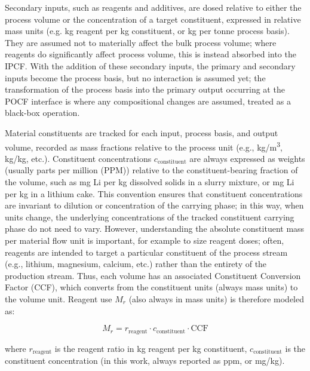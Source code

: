 \documentclass{article}
\renewcommand\_{\textunderscore\allowbreak}
\begin{document}
Secondary inputs, such as reagents and additives, are dosed relative to either the process volume or the concentration of a target constituent, expressed in relative mass units (e.g. kg reagent per kg constituent, or kg per tonne process basis). They are assumed not to materially affect the bulk process volume; where reagents do significantly affect process volume, this is instead absorbed into the IPCF. With the addition of these secondary inputs, the primary and secondary inputs become the process basis, but no interaction is assumed yet; the transformation of the process basis into the primary output occurring at the POCF interface is where any compositional changes are assumed, treated as a black-box operation. 

Material constituents are tracked for each input, process basis, and output volume, recorded as mass fractions relative to the process unit (e.g., \si{kg/m^3}, kg/kg, etc.). Constituent concentrations $c_\text{constituent}$ are always expressed as weights (usually parts per million (PPM)) relative to the constituent-bearing fraction of the volume, such as mg Li per kg dissolved solids in a slurry mixture, or mg Li per kg  in a lithium cake. This convention ensures that constituent concentrations are invariant to dilution or concentration of the carrying phase; in this way, when units change, the underlying concentrations of the tracked constituent carrying phase do not need to vary. However, understanding the absolute constituent mass per material flow unit is important, for example to size reagent doses; often, reagents are intended to target a particular constituent of the process stream (e.g., lithium, magnesium, calcium, etc.) rather than the entirety of the production stream. Thus, each volume has an associated Constituent Conversion Factor (CCF), which converts from the constituent units (always mass units) to the volume unit. Reagent use $M_r$ (also always in mass units) is therefore modeled as:

\begin{equation}
    M_r = r_\text{reagent} \cdot c_\text{constituent} \cdot \text{CCF}
    \label{eq:c-reagentmass}
\end{equation}

where $r_\text{reagent}$ is the reagent ratio in kg reagent per kg constituent, $c_\text{constituent}$ is the constituent concentration (in this work, always reported as ppm, or mg/kg).
\end{document}
